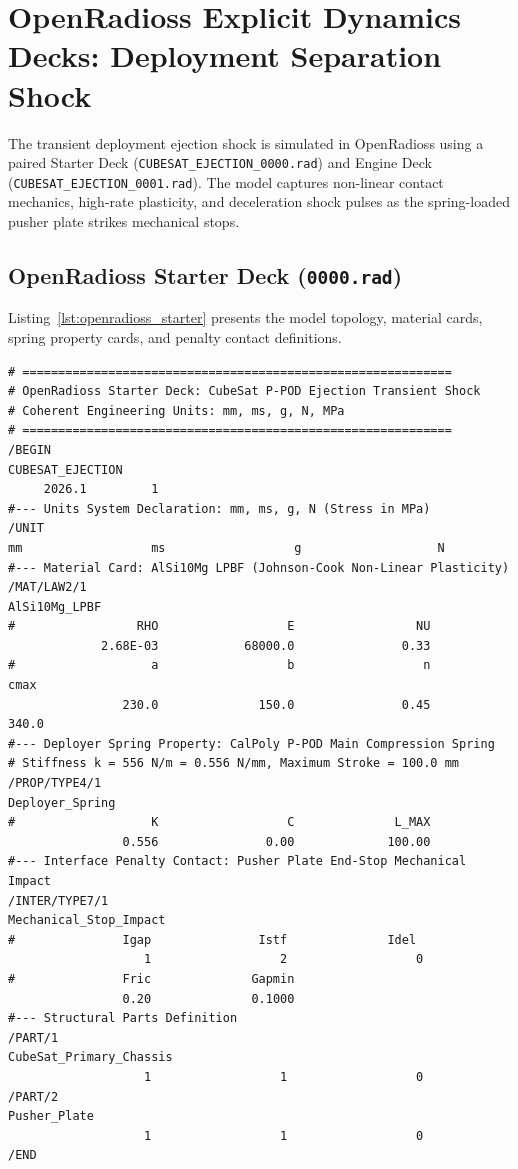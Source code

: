 \section{OpenRadioss Explicit Dynamics Decks: Deployment Separation Shock}
\label{sec:deck_openradioss}

The transient deployment ejection shock is simulated in OpenRadioss using a paired Starter Deck (\texttt{CUBESAT\_EJECTION\_0000.rad}) and Engine Deck (\texttt{CUBESAT\_EJECTION\_0001.rad}). The model captures non-linear contact mechanics, high-rate plasticity, and deceleration shock pulses as the spring-loaded pusher plate strikes mechanical stops.

\subsection{OpenRadioss Starter Deck (\texttt{0000.rad})}

Listing~\ref{lst:openradioss_starter} presents the model topology, material cards, spring property cards, and penalty contact definitions.

\begin{lstlisting}[caption={OpenRadioss Starter Deck modeling P-POD ejection spring dynamics and end-stop impact.}, label={lst:openradioss_starter}]
# ============================================================
# OpenRadioss Starter Deck: CubeSat P-POD Ejection Transient Shock
# Coherent Engineering Units: mm, ms, g, N, MPa
# ============================================================
/BEGIN
CUBESAT_EJECTION
     2026.1         1
#--- Units System Declaration: mm, ms, g, N (Stress in MPa)
/UNIT
mm                  ms                  g                   N
#--- Material Card: AlSi10Mg LPBF (Johnson-Cook Non-Linear Plasticity)
/MAT/LAW2/1
AlSi10Mg_LPBF
#                 RHO                  E                 NU
             2.68E-03            68000.0               0.33
#                   a                  b                  n                cmax
                230.0              150.0               0.45               340.0
#--- Deployer Spring Property: CalPoly P-POD Main Compression Spring
# Stiffness k = 556 N/m = 0.556 N/mm, Maximum Stroke = 100.0 mm
/PROP/TYPE4/1
Deployer_Spring
#                   K                  C              L_MAX
                0.556               0.00             100.00
#--- Interface Penalty Contact: Pusher Plate End-Stop Mechanical Impact
/INTER/TYPE7/1
Mechanical_Stop_Impact
#               Igap               Istf              Idel
                   1                  2                  0
#               Fric              Gapmin
                0.20              0.1000
#--- Structural Parts Definition
/PART/1
CubeSat_Primary_Chassis
                   1                  1                  0
/PART/2
Pusher_Plate
                   1                  1                  0
/END
\end{lstlisting}

